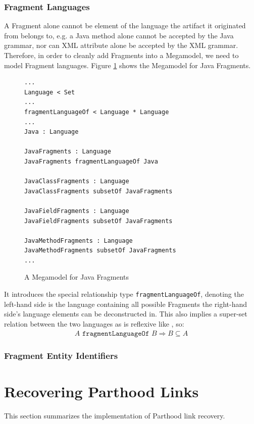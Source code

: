 \subsubsection{Fragment Languages}
\label{subsubsection:FragmentLanguages}
A \gls{Fragment} alone cannot be element of the language the artifact it originated from belongs to, e.g. a \gls{Java} method alone cannot be accepted by the \gls{Java} grammar, nor can \gls{XML} attribute alone be accepted by the \gls{XML} grammar.
Therefore, in order to cleanly add \glspl{Fragment} into a \gls{Megamodel}, we need to model \gls{Fragment} languages.
Figure \ref{figure:JavaFragmentMegamodel} shows the \gls{Megamodel} for \gls{Java} \glspl{Fragment}.
\begin{figure}[h!]
\begin{lstlisting}
...
Language < Set
...
fragmentLanguageOf < Language * Language
...
Java : Language

JavaFragments : Language
JavaFragments fragmentLanguageOf Java

JavaClassFragments : Language
JavaClassFragments subsetOf JavaFragments

JavaFieldFragments : Language
JavaFieldFragments subsetOf JavaFragments

JavaMethodFragments : Language
JavaMethodFragments subsetOf JavaFragments
...
\end{lstlisting}
{
\scriptsize
}
\caption{A \Gls{Megamodel} for \Gls{Java} \Glspl{Fragment}}
\label{figure:JavaFragmentMegamodel}
\end{figure}
It introduces the special relationship type \texttt{fragmentLanguageOf}, denoting the left-hand side is the language containing all possible \glspl{Fragment}  the right-hand side's language elements can be deconstructed in.
This also implies a super-set relation between the two languages as \fragmentOf is reflexive like \partOf, so:
\begin{align*}
A \texttt{~fragmentLanguageOf~} B \Rightarrow B \subseteq A
\end{align*}

\subsubsection{Fragment Entity Identifiers}
\label{subsubsection:FragmentEntityIdentifiers}

\section{Recovering Parthood Links}
\label{section:RecoveringParthoodLinks}
This section summarizes the implementation of \gls{Parthood} link recovery.




